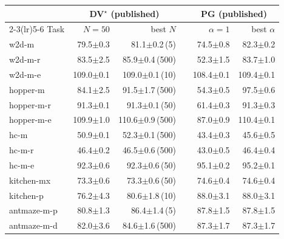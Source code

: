 \begin{tabular}{l rr r rr}
\toprule
 & \multicolumn{2}{c}{DV$^\star$ (published)} & & \multicolumn{2}{c}{PG (published)} \\
\cmidrule(lr){2-3}\cmidrule(lr){5-6}
Task & $N{=}50$ & best $N$ & & $\alpha{=}1$ & best $\alpha$ \\
\midrule
w2d-m & 79.5{\scriptsize$\pm$0.3} & 81.1{\scriptsize$\pm$0.2}\,{\scriptsize(5)} & & 74.5{\scriptsize$\pm$0.8} & 82.3{\scriptsize$\pm$0.2} \\
w2d-m-r & 83.5{\scriptsize$\pm$2.5} & 85.9{\scriptsize$\pm$0.4}\,{\scriptsize(500)} & & 52.3{\scriptsize$\pm$1.5} & 83.7{\scriptsize$\pm$1.0} \\
w2d-m-e & 109.0{\scriptsize$\pm$0.1} & 109.0{\scriptsize$\pm$0.1}\,{\scriptsize(10)} & & 108.4{\scriptsize$\pm$0.1} & 109.4{\scriptsize$\pm$0.1} \\
hopper-m & 84.1{\scriptsize$\pm$2.5} & 91.5{\scriptsize$\pm$1.7}\,{\scriptsize(500)} & & 54.3{\scriptsize$\pm$0.5} & 97.5{\scriptsize$\pm$0.6} \\
hopper-m-r & 91.3{\scriptsize$\pm$0.1} & 91.3{\scriptsize$\pm$0.1}\,{\scriptsize(50)} & & 61.4{\scriptsize$\pm$0.3} & 91.3{\scriptsize$\pm$0.3} \\
hopper-m-e & 109.9{\scriptsize$\pm$1.0} & 110.6{\scriptsize$\pm$0.9}\,{\scriptsize(500)} & & 87.0{\scriptsize$\pm$0.9} & 110.4{\scriptsize$\pm$0.1} \\
hc-m & 50.9{\scriptsize$\pm$0.1} & 52.3{\scriptsize$\pm$0.1}\,{\scriptsize(500)} & & 43.4{\scriptsize$\pm$0.3} & 45.6{\scriptsize$\pm$0.5} \\
hc-m-r & 46.4{\scriptsize$\pm$0.2} & 46.5{\scriptsize$\pm$0.6}\,{\scriptsize(500)} & & 43.0{\scriptsize$\pm$0.5} & 46.4{\scriptsize$\pm$0.4} \\
hc-m-e & 92.3{\scriptsize$\pm$0.6} & 92.3{\scriptsize$\pm$0.6}\,{\scriptsize(50)} & & 95.1{\scriptsize$\pm$0.2} & 95.2{\scriptsize$\pm$0.1} \\
kitchen-mx & 73.3{\scriptsize$\pm$0.6} & 73.3{\scriptsize$\pm$0.6}\,{\scriptsize(50)} & & 74.6{\scriptsize$\pm$0.4} & 74.6{\scriptsize$\pm$0.4} \\
kitchen-p & 76.2{\scriptsize$\pm$4.3} & 80.6{\scriptsize$\pm$1.8}\,{\scriptsize(10)} & & 88.0{\scriptsize$\pm$3.1} & 88.0{\scriptsize$\pm$3.1} \\
antmaze-m-p & 80.8{\scriptsize$\pm$1.3} & 86.4{\scriptsize$\pm$1.4}\,{\scriptsize(5)} & & 87.8{\scriptsize$\pm$1.5} & 87.8{\scriptsize$\pm$1.5} \\
antmaze-m-d & 82.0{\scriptsize$\pm$3.6} & 84.6{\scriptsize$\pm$1.6}\,{\scriptsize(500)} & & 87.3{\scriptsize$\pm$1.7} & 87.3{\scriptsize$\pm$1.7} \\

\end{tabular}
